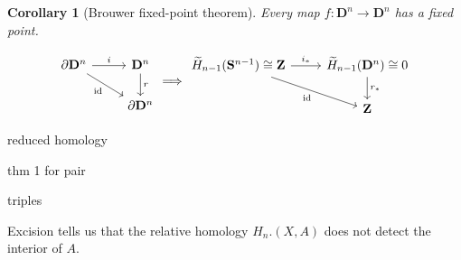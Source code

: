 \documentclass[11pt]{article}
\theoremstyle{definition}
\theoremstyle{plain}
\newtheorem*{corollary}{Corollary}
\theoremstyle{remark}
\newcommand{\id}{\textrm{id}}
\newcommand{\Z}{\mathbf{Z}}
\begin{document}
\begin{corollary}[Brouwer fixed-point theorem]
Every map $f:\mathbf{D}^n\to\mathbf{D}^n$ has a fixed point.
\end{corollary}
\[\begin{tikzcd}
\partial\mathbf{D}^n\arrow[swap]{dr}{\id}\arrow{r}{i}&\mathbf{D}^n\arrow{d}{r}\\
&\partial\mathbf{D}^n
\end{tikzcd}\Longrightarrow\begin{tikzcd}
\widetilde{H}_{n-1}(\mathbf{S}^{n-1})\cong\Z\arrow[swap]{dr}{\id}\arrow{r}{i_\ast}&\widetilde{H}_{n-1}(\mathbf{D}^n)\cong0\arrow{d}{r_\ast}\\
&\Z
\end{tikzcd}\]

reduced homology

thm 1 for pair

triples

Excision tells us that the relative homology $H_n.(X,A)$ does not detect the interior of $A$.
\end{document}
